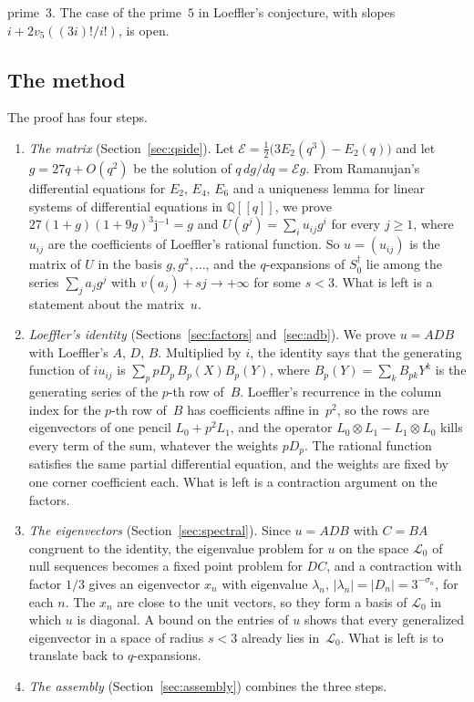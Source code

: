 \documentclass[11pt]{amsart}
\theoremstyle{definition}
\numberwithin{equation}{section}
\newcommand{\Q}{\mathbb{Q}}
\newcommand{\Sd}{S_0^{\dagger}}
\newcommand{\jj}{\mathrm{j}}
\newcommand{\jinv}{\jj^{-1}}
\newcommand{\cE}{\mathcal{E}}
\newcommand{\Lc}{\mathcal{L}_0}
\newcommand{\sig}{\sigma}
\begin{document}
prime~$3$. The case of the prime~$5$ in Loeffler's conjecture, with slopes $i+2v_5((3i)!/i!)$, is open.

\subsection*{The method}
The proof has four steps.
\begin{enumerate}
\item \emph{The matrix} (Section~\ref{sec:qside}). Let $\cE=\tfrac12\bigl(3E_2(q^3)-E_2(q)\bigr)$ and let $g=27q+O(q^2)$ be the solution of $q\,dg/dq=\cE g$. From Ramanujan's differential equations for $E_2$, $E_4$, $E_6$ and a uniqueness lemma for linear systems of differential equations in $\Q[[q]]$, we prove $27(1+g)(1+9g)^3\jinv=g$ and $U(g^j)=\sum_iu_{ij}g^i$ for every $j\ge1$, where $u_{ij}$ are the coefficients of Loeffler's rational function. So $u=(u_{ij})$ is the matrix of $U$ in the basis $g,g^2,\ldots$, and the $q$-expansions of $\Sd$ lie among the series $\sum_ja_jg^j$ with $v(a_j)+sj\to+\infty$ for some $s<3$. What is left is a statement about the matrix~$u$.
\item \emph{Loeffler's identity} (Sections~\ref{sec:factors} and~\ref{sec:adb}). We prove $u=ADB$ with Loeffler's $A$, $D$, $B$. Multiplied by $i$, the identity says that the generating function of $iu_{ij}$ is $\sum_p pD_p\,B_p(X)B_p(Y)$, where $B_p(Y)=\sum_kB_{pk}Y^k$ is the generating series of the $p$-th row of~$B$. Loeffler's recurrence in the column index for the $p$-th row of~$B$ has coefficients affine in~$p^2$, so the rows are eigenvectors of one pencil $L_0+p^2L_1$, and the operator $L_0\otimes L_1-L_1\otimes L_0$ kills every term of the sum, whatever the weights $pD_p$. The rational function satisfies the same partial differential equation, and the weights are fixed by one corner coefficient each. What is left is a contraction argument on the factors.
\item \emph{The eigenvectors} (Section~\ref{sec:spectral}). Since $u=ADB$ with $C=BA$ congruent to the identity, the eigenvalue problem for $u$ on the space $\Lc$ of null sequences becomes a fixed point problem for $DC$, and a contraction with factor $1/3$ gives an eigenvector $x_n$ with eigenvalue $\lambda_n$, $|\lambda_n|=|D_n|=3^{-\sig_n}$, for each $n$. The $x_n$ are close to the unit vectors, so they form a basis of $\Lc$ in which $u$ is diagonal. A bound on the entries of $u$ shows that every generalized eigenvector in a space of radius $s<3$ already lies in~$\Lc$. What is left is to translate back to $q$-expansions.
\item \emph{The assembly} (Section~\ref{sec:assembly}) combines the three steps.
\end{enumerate}
\end{document}
